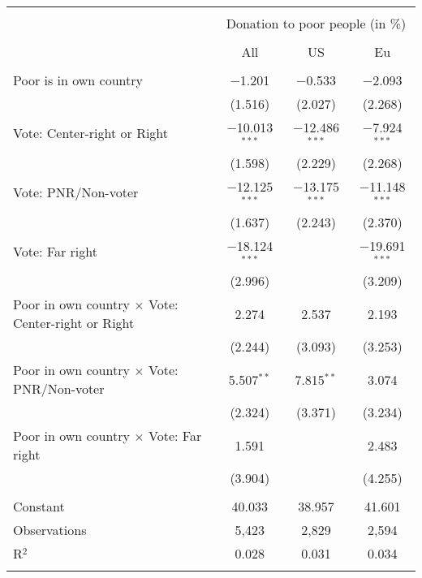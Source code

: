 
\begin{tabular}{@{\extracolsep{5pt}}lccc} 
\\[-1.8ex]\hline 
\hline \\[-1.8ex] 
 & \multicolumn{3}{c}{Donation to poor people (in \%)} \\ 
\cline{2-4} 
\\[-1.8ex] & All & US & Eu \\ 
\hline \\[-1.8ex] 
 Poor is in own country & $-$1.201 & $-$0.533 & $-$2.093 \\ 
  & (1.516) & (2.027) & (2.268) \\ 
  Vote: Center-right or Right & $-$10.013$^{***}$ & $-$12.486$^{***}$ & $-$7.924$^{***}$ \\ 
  & (1.598) & (2.229) & (2.268) \\ 
  Vote: PNR/Non-voter & $-$12.125$^{***}$ & $-$13.175$^{***}$ & $-$11.148$^{***}$ \\ 
  & (1.637) & (2.243) & (2.370) \\ 
  Vote: Far right & $-$18.124$^{***}$ &  & $-$19.691$^{***}$ \\ 
  & (2.996) &  & (3.209) \\ 
  Poor in own country $\times$ Vote: Center-right or Right & 2.274 & 2.537 & 2.193 \\ 
  & (2.244) & (3.093) & (3.253) \\ 
  Poor in own country $\times$ Vote: PNR/Non-voter & 5.507$^{**}$ & 7.815$^{**}$ & 3.074 \\ 
  & (2.324) & (3.371) & (3.234) \\ 
  Poor in own country $\times$ Vote: Far right & 1.591 &  & 2.483 \\ 
  & (3.904) &  & (4.255) \\ 
 \hline \\[-1.8ex] 
Constant & 40.033 & 38.957 & 41.601 \\ 
Observations & 5,423 & 2,829 & 2,594 \\ 
R$^{2}$ & 0.028 & 0.031 & 0.034 \\ 
\hline 
\hline \\[-1.8ex] 
\end{tabular} 
